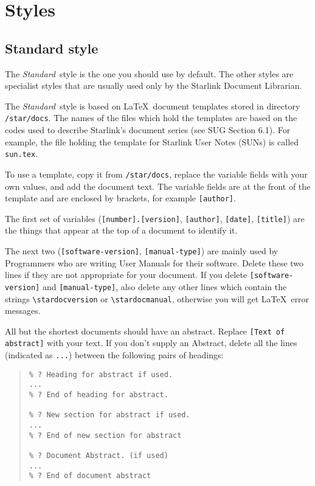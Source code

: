 \documentclass[twoside,11pt]{article}
\newcommand{\xref}[3]{#1}
\newcommand{\xlabel}[1]{}
\begin{document}
\section{\label{styles}\xlabel{styles}Styles}

\subsection{\label{standard_style}\xlabel{standard_style}Standard style}

The {\em Standard}\, style is the one you should use by default.
The other styles are specialist styles that are usually used only by the
Starlink Document Librarian.

The {\em Standard}\, style is based on \LaTeX\ document templates stored in
directory {\tt /star/docs}.
The names of the files which hold the templates are based on the codes
used to describe Starlink's document series (see
\xref{SUG}{sug}{} Section 6.1).
For example, the file holding the template for Starlink User Notes (SUNs)
is called {\tt sun.tex}.

To use a template, copy it from {\tt /star/docs}, replace the variable fields
with your own values, and add the document text.
The variable fields are at the front of the template and are enclosed by
brackets, for example {\tt [author]}.

The first set of variables ({\tt [number].[version]}, {\tt [author]},
{\tt [date]}, {\tt [title]}) are the things that appear at the top of a
document to identify it.

The next two ({\tt [software-version]}, {\tt [manual-type]}) are mainly used
by Programmers who are writing User Manuals for their software.
Delete these two lines if they are not appropriate for your document.
If you delete {\tt [software-version]} and {\tt [manual-type]},
also delete any other lines which contain the strings
\verb+\stardocversion+ or \verb+\stardocmanual+, otherwise you will get
\LaTeX\ error messages.

All but the shortest documents should have an abstract.
Replace {\tt [Text of abstract]} with your text.
If you don't supply an Abstract, delete all the lines (indicated as
{\tt ...}) between the following pairs of headings:
\begin{quote}
\begin{verbatim}
% ? Heading for abstract if used.
...
% ? End of heading for abstract.

% ? New section for abstract if used.
...
% ? End of new section for abstract

% ? Document Abstract. (if used)
...
% ? End of document abstract
\end{verbatim}
\end{quote}
\end{document}
